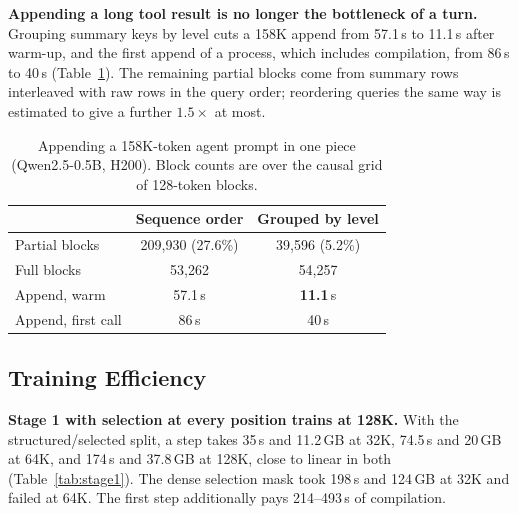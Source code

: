 \documentclass[10pt,twocolumn]{article}
\newcommand{\para}[1]{\noindent\textbf{#1}\hspace{0.5em}}
\begin{document}
\para{Appending a long tool result is no longer the bottleneck of a turn.}
Grouping summary keys by level cuts a 158K append from 57.1\,s to 11.1\,s after warm-up, and
the first append of a process, which includes compilation, from 86\,s to 40\,s
(Table~\ref{tab:prefill}). The remaining partial blocks come from summary rows interleaved
with raw rows in the query order; reordering queries the same way is estimated to give a
further $1.5\times$ at most.

\begin{table}[t]
\caption{Appending a 158K-token agent prompt in one piece (Qwen2.5-0.5B, H200). Block counts
are over the causal grid of 128-token blocks.}
\label{tab:prefill}
\centering\small
\begin{tabular}{lcc}
\toprule
& Sequence order & Grouped by level \\
\midrule
Partial blocks & 209,930 (27.6\%) & 39,596 (5.2\%) \\
Full blocks & 53,262 & 54,257 \\
Append, warm & 57.1\,s & \textbf{11.1}\,s \\
Append, first call & 86\,s & 40\,s \\
\bottomrule
\end{tabular}
\end{table}

\subsection{Training Efficiency}

\para{Stage 1 with selection at every position trains at 128K.}
With the structured/selected split, a step takes 35\,s and 11.2\,GB at 32K, 74.5\,s and 20\,GB at
64K, and 174\,s and 37.8\,GB at 128K, close to linear in both (Table~\ref{tab:stage1}). The dense
selection mask took 198\,s and 124\,GB at 32K and failed at 64K. The first step additionally
pays 214--493\,s of compilation.
\end{document}
